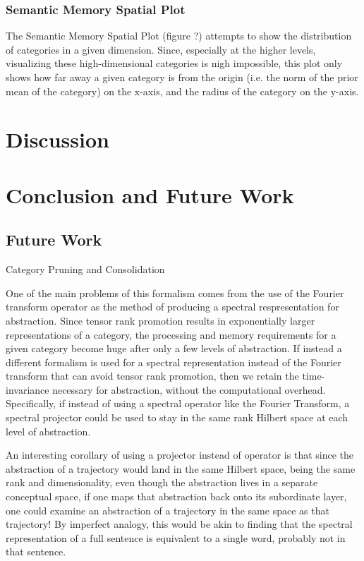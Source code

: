 \documentclass[runningheads]{llncs}
\begin{document}
\subsubsection{Semantic Memory Spatial Plot}

The Semantic Memory Spatial Plot (figure ?) attempts to show the distribution of categories in a given dimension.  Since, especially at the higher levels, visualizing these high-dimensional categories is nigh impossible, this plot only shows how far away a given category is from the origin (i.e. the norm of the prior mean of the category) on the x-axis, and the radius of the category on the y-axis.


\section{Discussion}


\section{Conclusion and Future Work}

\subsection{Future Work}

Category Pruning and Consolidation

One of the main problems of this formalism comes from the use of the Fourier transform operator as the method of producing a spectral respresentation for abstraction.  Since tensor rank promotion results in exponentially larger representations of a category, the processing and memory requirements for a given category become huge after only a few levels of abstraction.  If instead a different formalism is used for a spectral representation instead of the Fourier transform that can avoid tensor rank promotion, then we retain the time-invariance necessary for abstraction, without the computational overhead. Specifically, if instead of using a spectral operator like the Fourier Transform, a spectral projector could be used to stay in the same rank Hilbert space at each level of abstraction.

An interesting corollary of using a projector instead of operator is that since the abstraction of a trajectory would land in the same Hilbert space, being the same rank and dimensionality, even though the abstraction lives in a separate conceptual space, if one maps that abstraction back onto its subordinate layer, one could examine an abstraction of a trajectory in the same space as that trajectory!  By imperfect analogy, this would be akin to finding that the spectral representation of a full sentence is equivalent to a single word, probably not in that sentence.

%
%



%
\end{document}
